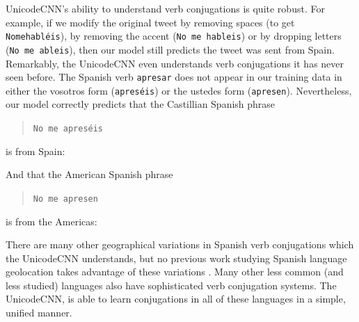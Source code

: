 \documentclass[sigconf,anonymous,review,10pt]{acmart}
\newcommand{\str}[1]{\texttt{#1}}
\begin{document}
\begin{description}
UnicodeCNN's ability to understand verb conjugations is quite robust.
For example, if we modify the original tweet by removing spaces (to get \str{Nomehabl\'eis}),
by removing the accent (\str{No me hableis})
or by dropping letters (\str{No me ableis}),
then our model still predicts the tweet was sent from Spain.
%
%
Remarkably, the UnicodeCNN even understands verb conjugations it has never seen before.
The Spanish verb \str{apresar} does not appear in our training data in either the vosotros form (\str{apres\'eis}) or the ustedes form (\str{apresen}).
Nevertheless, our model correctly predicts that the Castillian Spanish phrase
\begin{quote}
    \str{No me apres\'eis}
\end{quote}
is from Spain:

\noindent

\noindent
And that the American Spanish phrase 
\begin{quote}
    \str{No me apresen}
\end{quote}
is from the Americas:

\noindent

There are many other geographical variations in Spanish verb conjugations which the UnicodeCNN understands,
but no previous work studying Spanish language geolocation takes advantage of these variations \citep{maier2014language,gonccalves2015learning,tinoco2017variation,han2014text}. 
Many other less common (and less studied) languages also have sophisticated verb conjugation systems.
The UnicodeCNN, is able to learn conjugations in all of these languages in a simple, unified manner.


\end{description}
\end{document}
